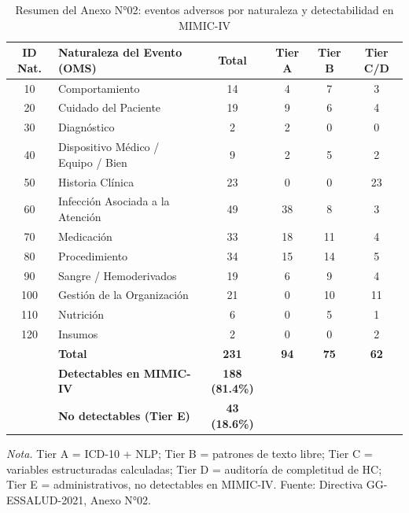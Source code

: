 \documentclass[12pt,a4paper,oneside]{book}
\begin{document}
\vspace{6pt}
\begin{table}[h!]
\centering
\caption{Resumen del Anexo N°02: eventos adversos por naturaleza y detectabilidad en MIMIC-IV}
\label{tab:anexo02}
\small
\begin{tabular}{clcccc}
\toprule
\textbf{ID Nat.} & \textbf{Naturaleza del Evento (OMS)} & \textbf{Total} & \textbf{Tier A} & \textbf{Tier B} & \textbf{Tier C/D} \\
\midrule
10  & Comportamiento                         & 14  & 4  & 7  & 3  \\
20  & Cuidado del Paciente                   & 19  & 9  & 6  & 4  \\
30  & Diagnóstico                            &  2  & 2  & 0  & 0  \\
40  & Dispositivo Médico / Equipo / Bien     &  9  & 2  & 5  & 2  \\
50  & Historia Clínica                       & 23  & 0  & 0  & 23 \\
60  & Infección Asociada a la Atención       & 49  & 38 & 8  & 3  \\
70  & Medicación                             & 33  & 18 & 11 & 4  \\
80  & Procedimiento                          & 34  & 15 & 14 & 5  \\
90  & Sangre / Hemoderivados                 & 19  & 6  & 9  & 4  \\
100 & Gestión de la Organización             & 21  & 0  & 10 & 11 \\
110 & Nutrición                              &  6  & 0  & 5  & 1  \\
120 & Insumos                                &  2  & 0  & 0  & 2  \\
\midrule
    & \textbf{Total}                         & \textbf{231} & \textbf{94} & \textbf{75} & \textbf{62} \\
    & \textbf{Detectables en MIMIC-IV}       & \textbf{188 (81.4\%)} & & & \\
    & \textbf{No detectables (Tier E)}       & \textbf{43 (18.6\%)} & & & \\
\bottomrule
\end{tabular}

\vspace{4pt}
\footnotesize\textit{Nota.} Tier A = ICD-10 + NLP; Tier B = patrones de texto libre; Tier C = variables estructuradas calculadas; Tier D = auditoría de completitud de HC; Tier E = administrativos, no detectables en MIMIC-IV. Fuente: Directiva GG-ESSALUD-2021, Anexo N°02.
\end{table}
\end{document}
